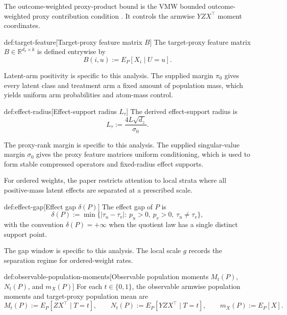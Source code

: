 The outcome-weighted proxy-product bound is the VMW bounded outcome-weighted proxy contribution condition \citep{VirkMazaheriWu2026}. It controls the armwise \(YZX^\top\) moment coordinates.

\begin{definitionv}{def:target-feature}[Target-proxy feature matrix \(B\)]
The target-proxy feature matrix \(B\in\mathbb R^{d_x\times k}\) is defined entrywise by
\[
B(i,u):=E_P\!\left[X_i\mid U=u\right].
\]
\end{definitionv}

Latent-arm positivity is specific to this analysis. The supplied margin \(\pi_0\) gives every latent class and treatment arm a fixed amount of population mass, which yields uniform arm probabilities and atom-mass control.

\begin{definitionv}{def:effect-radius}[Effect-support radius \(L_\tau\)]
The derived effect-support radius is
\[
L_\tau := \frac{4L\sqrt{d_z}}{\sigma_0}.
\]
\end{definitionv}

The proxy-rank margin is specific to this analysis. The supplied singular-value margin \(\sigma_0\) gives the proxy feature matrices uniform conditioning, which is used to form stable compressed operators and fixed-radius effect supports.

For ordered weights, the paper restricts attention to local strata where all positive-mass latent effects are separated at a prescribed scale.

\begin{definitionv}{def:effect-gap}[Effect gap \(\delta(P)\)]
The effect gap of \(P\) is
\[
\delta(P)
:=
\min\bigl\{|\tau_u-\tau_v|:\ p_u>0,\ p_v>0,\ \tau_u\ne\tau_v\bigr\},
\]
with the convention \(\delta(P)=+\infty\) when the quotient law has a single distinct support point.
\end{definitionv}

The gap window is specific to this analysis. The local scale \(g\) records the separation regime for ordered-weight rates.

\begin{definitionv}{def:observable-population-moments}[Observable population moments \(M_t(P)\), \(N_t(P)\), and \(m_X(P)\)]
For each \(t\in\{0,1\}\), the observable armwise population moments and target-proxy population mean are
\[
M_t(P) := E_P[ZX^\top\mid T=t],
\qquad
N_t(P) := E_P[YZX^\top\mid T=t],
\qquad
m_X(P) := E_P[X].
\]
\end{definitionv}

